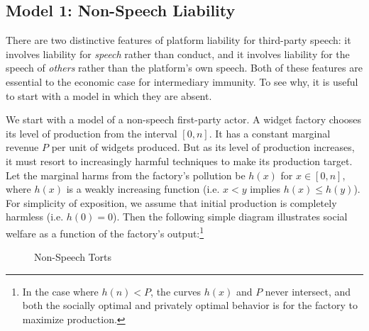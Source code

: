 

\subsection{Model 1: Non-Speech Liability}

There are two distinctive features of platform liability for third-party speech: it involves liability for \emph{speech} rather than conduct, and it involves liability for the speech of \emph{others} rather than the platform's own speech. Both of these features are essential to the economic case for intermediary immunity. To see why, it is useful to start with a model in which they are absent.

We start with a model of a non-speech first-party actor. A widget factory chooses its level of production from the interval $[0,n]$. It has a constant marginal revenue $P$ per unit of widgets produced. But as its level of production increases, it must resort to increasingly harmful techniques to make its production target. Let the marginal harms from the factory's pollution be $h(x)$ for $x \in [0,n]$, where $h(x)$ is a weakly increasing function (i.e. $x < y$ implies $h(x) \le h(y)$). For simplicity of exposition, we assume that initial production is completely harmless (i.e. $h(0) =0$). Then the following simple diagram illustrates social welfare as a function of the factory's output:\footnote{In the case where $h(n) < P$, the curves $h(x)$ and $P$ never intersect, and both the socially optimal and privately optimal behavior is for the factory to maximize production.}
\begin{figure}[h]
    \centering
{}
    \caption{Non-Speech Torts}
    \label{fig:nonspeech}
\end{figure}
